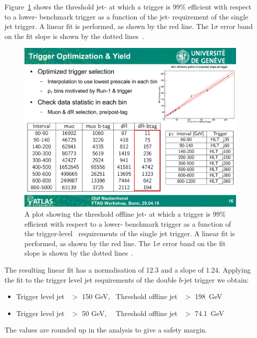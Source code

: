 Figure~\ref{fig:triggerTurnOn_fit} shows the threshold jet-\pT{} 
at which a trigger is 99\% efficient with respect to a lower-\pT{} benchmark trigger
as a function of the jet-\pT{} requirement of the single jet trigger.
A linear fit is performed, as shown by the red line.
The 1$\sigma$ error band on the fit slope is shown by the dotted lines~\cite{evt-jet_turnOnFit}.

\begin{figure}[!hbt]
    \begin{center}
        \includegraphics[width=0.7\linewidth, angle=0]{figs/Dibjet/LowMass/jetTriggerTurnOn.pdf}
      \end{center}
  \caption[A plot showing the threshold jet-\pT{} of a single jet trigger as a function of the trigger-level~\pT{} requirements.]
           {A plot showing the threshold offline jet-\pT{} at which a trigger is 99\% efficient
             with respect to a lower-\pT{} benchmark trigger as a function of the trigger-level~\pT{} requirements of the single jet trigger.
             A linear fit is performed, as shown by the red line. The 1$\sigma$ error band on the fit slope is shown by the dotted lines~\cite{evt-jet_turnOnFit}.}
          \label{fig:triggerTurnOn_fit}
\end{figure}

\noindent
The resulting linear fit has a normalisation of 12.3 and a slope of 1.24.
Applying the fit to the trigger level jet requirements of the double $b$-jet trigger we obtain:
\vspace{-0.5em}
\begin{itemize}[leftmargin=*]
\item Trigger level jet~\pT{} $>$ 150 GeV,~  Threshold offline jet~\pT{} $>$ 198~GeV 
\item Trigger level jet~\pT{} $>$  50 GeV,~~ Threshold offline jet~\pT{} $>$ 74.1~GeV
\end{itemize}
\vspace{-0.3em}
\noindent
The values are rounded up in the analysis to give a safety margin.

